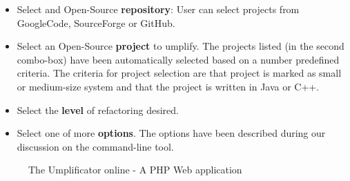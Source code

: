 \begin{itemize}
\item Select and Open-Source \textbf{repository}: User can select projects from GoogleCode, SourceForge or GitHub.
\item Select an Open-Source \textbf{project} to umplify. The projects listed (in the second combo-box) have been automatically selected based on a number predefined criteria. The criteria for project selection are that project is marked as small or medium-size system and that the project is written in Java or C++.
\item Select the \textbf{level} of refactoring desired.
\item Select one of more \textbf{options}. The options have been described during our discussion on the command-line tool.
\end{itemize}

\begin{figure}[h]
\centering
{}
\caption{The Umplificator online - A PHP Web application}
\label{fig:umpleonline}
\end{figure}



